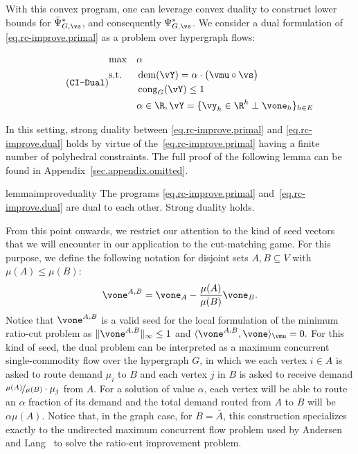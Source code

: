 \documentclass[letterpaper]{article}
\newcommand{\dem}{\operatorname{dem}}
\renewcommand{\cong}{\operatorname{cong}}
\begin{document}
With this convex program, one can leverage convex duality to construct lower bounds for $\bar{\Psi}^*_{G, \vs}$, and consequently $\Psi^*_{G, \vs}$. We consider a dual formulation of \eqref{eq.rc-improve.primal} as a problem over hypergraph flows:

\begin{equation*}
\stepcounter{equation}
\tag{\texttt{CI-Dual}}
\label{eq.rc-improve.dual}
\begin{aligned}
&  {\max}
& & \alpha \\
& \textup{s.t.}
& & \dem(\vY) = \alpha \cdot \big( \vmu \circ \vs \big) \\
& & & \cong_G(\vY) \leq 1\\
& & &  \alpha \in \R, \vY =\{\vy_h \in \R^h \perp \vone_h\}_{h\in E}
\end{aligned}
\end{equation*}

In this setting, strong duality between \eqref{eq.rc-improve.primal} and \eqref{eq.rc-improve.dual} holds by virtue of the~\eqref{eq.rc-improve.primal} having a finite number of polyhedral constraints. The full proof of the following lemma can be found in Appendix~\ref{sec.appendix.omitted}.
\begin{restatable}{lemma}{improveduality}
\label{lem.rc-improve.strong-duality}
The programs \eqref{eq.rc-improve.primal} and~\eqref{eq.rc-improve.dual} are dual to each other. Strong duality holds.
\end{restatable}
\noindent



From this point onwards, we restrict our attention to the kind of seed vectors that we will encounter in our application to the cut-matching game. For this purpose, we define the following notation for disjoint sets $A, B \subseteq V$ with $\mu(A) \leq \mu(B)$:
$$
\vone^{A,B} = \vone_A - \frac{\mu(A)}{\mu(B)} \vone_B.
$$
Notice that $\vone^{A,B}$ is a valid seed for the local formulation of the minimum ratio-cut problem as $\|\vone^{A,B}\|_\infty \leq 1$ and $\langle \vone^{A,B} , \vone \rangle_{\vmu} = 0.$
For this kind of seed, the dual problem can be interpreted as a maximum concurrent single-commodity flow over the hypergraph $G$, in which we each vertex $i \in A$ is asked to route demand $\mu_i$ to $B$ and each vertex $j$ in $B$ is asked to receive demand $\nicefrac{\mu(A)}{\mu(B)} \cdot \mu_j$ from $A$. For a solution of value $\alpha$, each vertex will be able to route an $\alpha$ fraction of its demand and the total demand routed from $A$ to $B$ will be $\alpha \mu(A).$
Notice that, in the graph case, for $B = \bar{A}$, this construction specializes exactly to the undirected maximum concurrent flow problem used by Andersen and Lang~\cite{Andersen-Lang} to solve the ratio-cut improvement problem.
\end{document}
